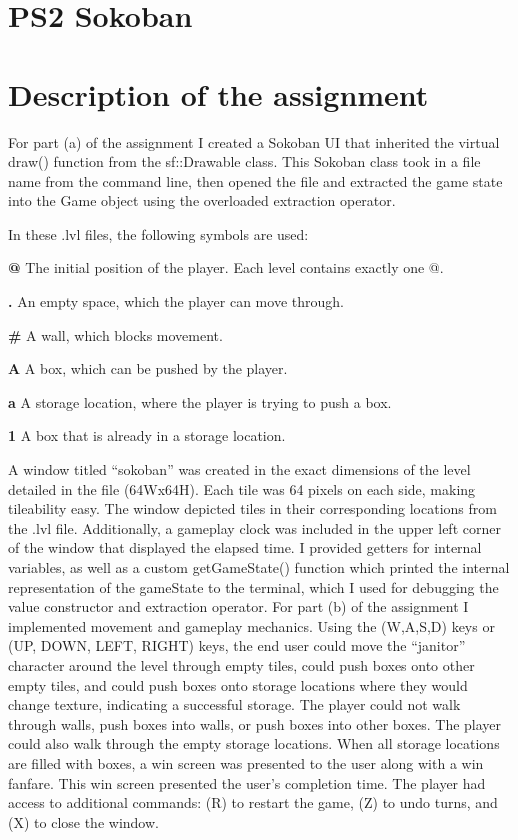 \documentclass[12pt]{article}
\begin{document}
\section*{PS2 Sokoban}
\section[1]{Description of the assignment}
\hfill\begin{minipage}{\dimexpr\textwidth-1cm}
For part (a) of the assignment I created a Sokoban UI that inherited the virtual draw() function from the sf::Drawable class. This Sokoban class took in a file name from the command line, then opened the file and extracted the game state into the Game object using the overloaded extraction operator.
\begin{description}
\item In these .lvl files, the following symbols are used:
\item \textbf{@} The initial position of the player. Each level contains exactly one @.
\item \textbf{.} An empty space, which the player can move through.
\item \textbf{\#} A wall, which blocks movement.
\item \textbf{A} A box, which can be pushed by the player.
\item \textbf{a} A storage location, where the player is trying to push a box.
\item \textbf{1} A box that is already in a storage location.
\end{description}
A window titled “sokoban” was created in the exact dimensions of the level detailed in the file (64Wx64H). Each tile was 64 pixels on each side, making tileability easy. The window depicted tiles in their corresponding locations from the .lvl file. Additionally, a gameplay clock was included in the upper left corner of the window that displayed the elapsed time. I provided getters for internal variables, as well as a custom getGameState() function which printed the internal representation of the gameState to the terminal, which I used for debugging the value constructor and extraction operator. \newline
\newline
For part (b) of the assignment I implemented movement and gameplay mechanics. Using the (W,A,S,D) keys or (UP, DOWN, LEFT, RIGHT) keys, the end user could move the “janitor” character around the level through empty tiles, could push boxes onto other empty tiles, and could push boxes onto storage locations where they would change texture, indicating a successful storage. The player could not walk through walls, push boxes into walls, or push boxes into other boxes. The player could also walk through the empty storage locations. When all storage locations are filled with boxes, a win screen was presented to the user along with a win fanfare. This win screen presented the user’s completion time. The player had access to additional commands: (R) to restart the game, (Z) to undo turns, and (X) to close the window.
\end{minipage}
\end{document}
